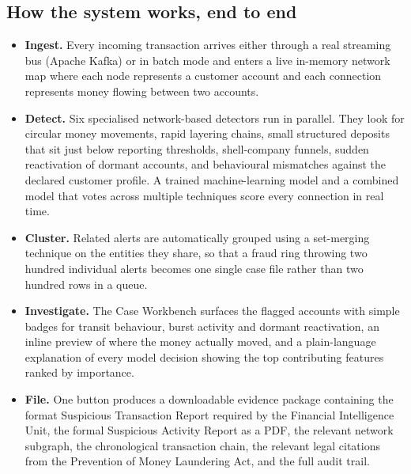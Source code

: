 \documentclass[10pt,a4paper]{article}
\begin{document}
\subsection*{How the system works, end to end}
\begin{itemize}
  \item \textbf{Ingest.} Every incoming transaction arrives either through a real streaming bus (Apache Kafka) or in batch mode and enters a live in-memory network map where each node represents a customer account and each connection represents money flowing between two accounts.
  \item \textbf{Detect.} Six specialised network-based detectors run in parallel. They look for circular money movements, rapid layering chains, small structured deposits that sit just below reporting thresholds, shell-company funnels, sudden reactivation of dormant accounts, and behavioural mismatches against the declared customer profile. A trained machine-learning model and a combined model that votes across multiple techniques score every connection in real time.
  \item \textbf{Cluster.} Related alerts are automatically grouped using a set-merging technique on the entities they share, so that a fraud ring throwing two hundred individual alerts becomes one single case file rather than two hundred rows in a queue.
  \item \textbf{Investigate.} The Case Workbench surfaces the flagged accounts with simple badges for transit behaviour, burst activity and dormant reactivation, an inline preview of where the money actually moved, and a plain-language explanation of every model decision showing the top contributing features ranked by importance.
  \item \textbf{File.} One button produces a downloadable evidence package containing the format Suspicious Transaction Report required by the Financial Intelligence Unit, the formal Suspicious Activity Report as a PDF, the relevant network subgraph, the chronological transaction chain, the relevant legal citations from the Prevention of Money Laundering Act, and the full audit trail.
\end{itemize}
\end{document}
